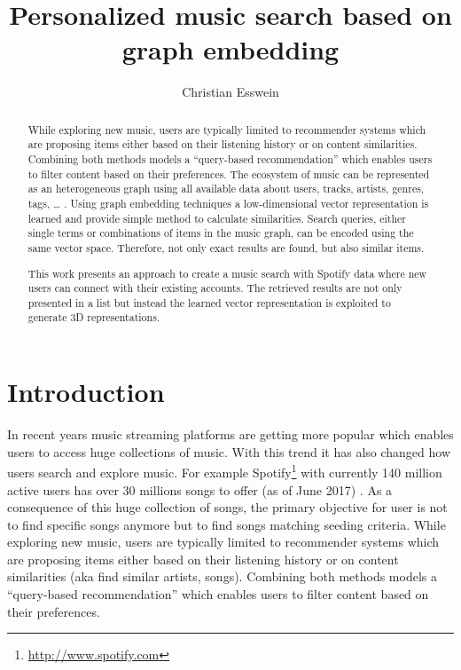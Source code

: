 \documentclass[a4paper]{llncs}
\title{Personalized music search based on graph embedding}
\author{Christian Esswein}
\institute{christian.esswein@student.uibk.ac.at}
\begin{document}
	
	\maketitle
	
	\begin{abstract}
		While exploring new music, users are typically limited to recommender systems which are proposing items either based on their listening history or on content similarities. Combining both methods models a “query-based recommendation” which enables users to filter content based on their preferences.
		The ecosystem of music can be represented as an heterogeneous graph using all available data about users, tracks, artists, genres, tags, … . Using graph embedding techniques a low-dimensional vector representation is learned and provide simple method to calculate similarities. Search queries, either single terms or combinations of items in the music graph, can be encoded using the same vector space. Therefore, not only exact results are found, but also similar items.
		
		This work presents an approach to create a music search with Spotify data where new users can connect with their existing accounts. The retrieved results are not only presented in a list but instead the learned vector representation is exploited to generate 3D representations.
		
		
	\end{abstract}
	
	\section{Introduction}
	In recent years music streaming platforms are getting more popular which enables users to access huge collections of music. With this trend it has also changed how users search and explore music\cite{lee2016look}. For example Spotify\footnote{\url{http://www.spotify.com}} with currently 140 million active users has over 30 millions songs to offer (as of June 2017)	\cite{aboutSpotify}. As a consequence of this huge collection of songs, the primary objective for user is not to find specific songs anymore but to find songs matching seeding criteria. 
	While exploring new music, users are typically limited to recommender systems which are proposing items either based on their listening history or on content similarities (aka find similar artists, songs). Combining both methods models a “query-based recommendation” which enables users to filter content based on their preferences.
	
\end{document}
